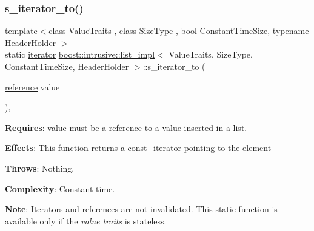 \subsubsection{\texorpdfstring{s\+\_\+iterator\+\_\+to()}{s\_iterator\_to()}\hspace{0.1cm}{\footnotesize\ttfamily [1/2]}}
{\footnotesize\ttfamily template$<$class Value\+Traits , class Size\+Type , bool Constant\+Time\+Size, typename Header\+Holder $>$ \\
static \hyperlink{classboost_1_1intrusive_1_1list__impl_a15c0189bf62eb9fb98bc07ef10b8cb23}{iterator} \hyperlink{classboost_1_1intrusive_1_1list__impl}{boost\+::intrusive\+::list\+\_\+impl}$<$ Value\+Traits, Size\+Type, Constant\+Time\+Size, Header\+Holder $>$\+::s\+\_\+iterator\+\_\+to (\begin{DoxyParamCaption}\item[{\hyperlink{classboost_1_1intrusive_1_1list__impl_a881763b587dbe7c0237a552a9e89755a}{reference}}]{value }\end{DoxyParamCaption})\hspace{0.3cm}{\ttfamily [inline]}, {\ttfamily [static]}}

{\bfseries Requires}\+: value must be a reference to a value inserted in a list.

{\bfseries Effects}\+: This function returns a const\+\_\+iterator pointing to the element

{\bfseries Throws}\+: Nothing.

{\bfseries Complexity}\+: Constant time.

{\bfseries Note}\+: Iterators and references are not invalidated. This static function is available only if the {\itshape value traits} is stateless. \mbox{\label{classboost_1_1intrusive_1_1list__impl_a649d0e05d1597b0b8054006cb3d217c3}} 
